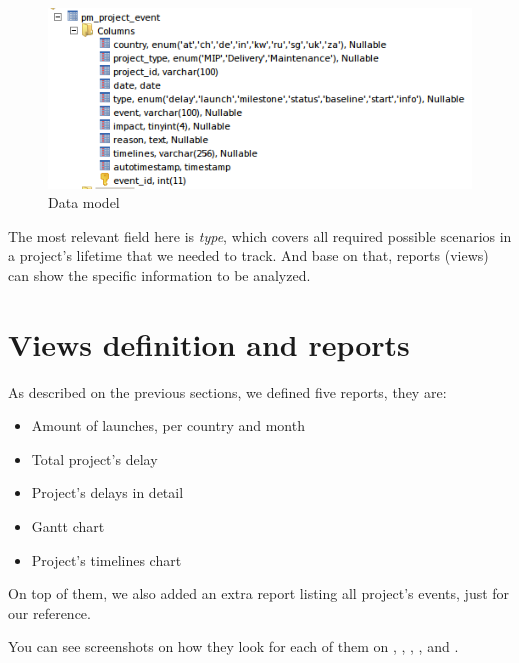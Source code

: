 \begin{figure}[ht!]
	\centering
   	\includegraphics[width=1\textwidth]{./resources/data_model.png}
   	\caption{Data model}
   	\label{f_data_model}
\end{figure}

The most relevant field here is \emph{type}, which covers all required possible
scenarios in a project's lifetime that we needed to track. And base on that, 
reports (views) can show the specific information to be analyzed.

\section{Views definition and reports}
As described on the previous sections, we defined five reports, they are:

\begin{itemize}
  \item Amount of launches, per country and month
  \item Total project's delay
  \item Project's delays in detail
  \item Gantt chart
  \item Project's timelines chart 
\end{itemize}

On top of them, we also added an extra report listing all project's events,
just for our reference.

You can see screenshots on how they look for each of them on
, ,
, ,
 and .

